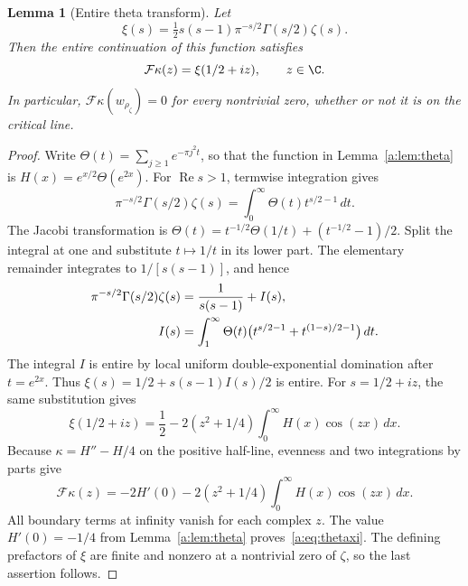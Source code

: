 \documentclass[11pt,a4paper]{article}
\numberwithin{equation}{section}
\newtheorem{lemma}[theorem]{Lemma}
\theoremstyle{definition}\newtheorem{definition}[theorem]{Definition}
\theoremstyle{remark}\newtheorem{remark}[theorem]{Remark}
\begin{document}
\begin{lemma}[Entire theta transform]\label{a:lem:thetaxi}
Let
\[
 \xi(s)=\tfrac12s(s-1)\pi^{-s/2}\Gamma(s/2)\zeta(s).
\]
Then the entire continuation of this function satisfies
\begin{equation}\label{a:eq:thetaxi}
 \mathcal F\kappa(z)=\xi(1/2+iz),\qquad z\in\C.
\end{equation}
In particular, $\mathcal F\kappa(w_{\rho_\zeta})=0$ for every nontrivial zero, whether or not it is on the critical line.
\end{lemma}
\begin{proof}
Write $\Theta(t)=\sum_{j\ge1}e^{-\pi j^2t}$, so that the function in Lemma~\ref{a:lem:theta} is $H(x)=e^{x/2}\Theta(e^{2x})$. For $\operatorname{Re}s>1$, termwise integration gives
\[
 \pi^{-s/2}\Gamma(s/2)\zeta(s)
   =\int_0^\infty\Theta(t)t^{s/2-1}\,dt.
\]
The Jacobi transformation is
$\Theta(t)=t^{-1/2}\Theta(1/t)+(t^{-1/2}-1)/2$.
Split the integral at one and substitute $t\mapsto1/t$ in its lower part. The elementary remainder integrates to $1/[s(s-1)]$, and hence
\begin{align}\label{a:eq:mellintheta}
 \pi^{-s/2}\Gamma(s/2)\zeta(s)
 &=\frac1{s(s-1)}+I(s),\notag\\
 I(s)&=\int_1^\infty\Theta(t)
       \bigl(t^{s/2-1}+t^{(1-s)/2-1}\bigr)\,dt.
\end{align}
The integral $I$ is entire by local uniform double-exponential domination after $t=e^{2x}$. Thus
$\xi(s)=1/2+s(s-1)I(s)/2$ is entire. For $s=1/2+iz$, the same substitution gives
\begin{equation}\label{a:eq:xiH}
 \xi(1/2+iz)=\frac12
       -2(z^2+1/4)\int_0^\infty H(x)\cos(zx)\,dx.
\end{equation}
Because $\kappa=H''-H/4$ on the positive half-line, evenness and two integrations by parts give
\[
 \mathcal F\kappa(z)
  =-2H'(0)-2(z^2+1/4)\int_0^\infty H(x)\cos(zx)\,dx.
\]
All boundary terms at infinity vanish for each complex $z$. The value $H'(0)=-1/4$ from Lemma~\ref{a:lem:theta} proves~\eqref{a:eq:thetaxi}. The defining prefactors of $\xi$ are finite and nonzero at a nontrivial zero of $\zeta$, so the last assertion follows.
\end{proof}
\end{document}
